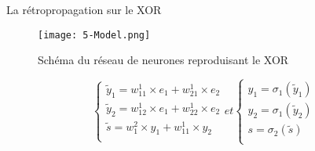 \begin{frame}{La rétropropagation sur le XOR}
    \begin{figure}
        \centering
        \texttt{[image: 5-Model.png]}
        \caption{Schéma du réseau de neurones reproduisant le XOR}
    \end{figure}
    \begin{equation}
        \begin{cases}
            \tilde{y}_1 = w^1_{11}\times e_1 +  w^1_{21}\times e_2 \\
            \tilde{y}_2 = w^1_{12}\times e_1 +  w^1_{22}\times e_2 \\
            \tilde{s}   = w^2_{1}\times y_1 +  w^1_{11}\times y_2  \\
        \end{cases}
        et
        \begin{cases}
            y_1 = \sigma_1(\tilde{y}_1) \\
            y_2 = \sigma_1(\tilde{y}_2) \\
            s = \sigma_2(\tilde{s})     \\
        \end{cases}
    \end{equation}
\end{frame}

